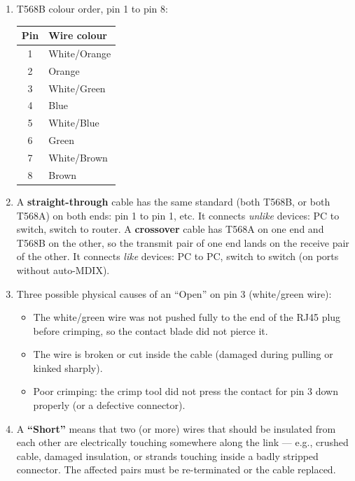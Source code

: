 \documentclass[11pt]{article}
\begin{document}
\begin{corrige}
\begin{enumerate}
\item T568B colour order, pin 1 to pin 8:
\begin{center}
\begin{tabularx}{\linewidth}{|c|X|}\hline
\rowcolor{popblueL}\textbf{Pin} & \textbf{Wire colour} \\ \hline
1 & White/Orange \\ \hline
2 & Orange \\ \hline
3 & White/Green \\ \hline
4 & Blue \\ \hline
5 & White/Blue \\ \hline
6 & Green \\ \hline
7 & White/Brown \\ \hline
8 & Brown \\ \hline
\end{tabularx}
\end{center}
\item A \textbf{straight-through} cable has the same standard (both T568B, or both T568A) on both ends: pin 1 to pin 1, etc. It connects \emph{unlike} devices: PC to switch, switch to router. A \textbf{crossover} cable has T568A on one end and T568B on the other, so the transmit pair of one end lands on the receive pair of the other. It connects \emph{like} devices: PC to PC, switch to switch (on ports without auto-MDIX).
\item Three possible physical causes of an ``Open'' on pin 3 (white/green wire):
\begin{itemize}
\item The white/green wire was not pushed fully to the end of the RJ45 plug before crimping, so the contact blade did not pierce it.
\item The wire is broken or cut inside the cable (damaged during pulling or kinked sharply).
\item Poor crimping: the crimp tool did not press the contact for pin 3 down properly (or a defective connector).
\end{itemize}
\item A \textbf{``Short''} means that two (or more) wires that should be insulated from each other are electrically touching somewhere along the link — e.g., crushed cable, damaged insulation, or strands touching inside a badly stripped connector. The affected pairs must be re-terminated or the cable replaced.
\end{enumerate}
\end{corrige}
\end{document}

